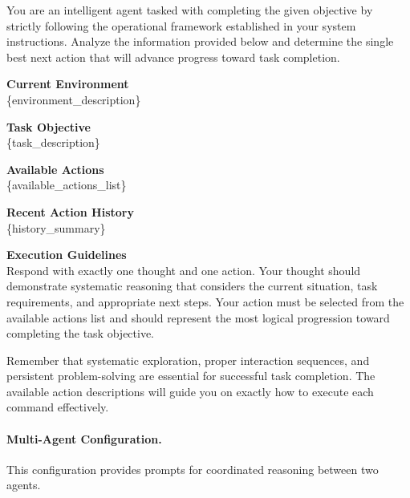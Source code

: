 \begin{tcolorbox}[
    colback=gray!10!white,
    colframe=black,
    title={User prompt for single-agent},
    fonttitle=\bfseries\small,
    breakable,
    enhanced,
    left=2mm,
    right=2mm,
    top=2mm,
    bottom=2mm,
    boxsep=1mm,
    arc=0pt,
    fontupper=\small\ttfamily,  %
    before skip=6pt,
    after skip=6pt
]
\begin{flushleft}
You are an intelligent agent tasked with completing the given objective by strictly following the operational framework established in your system instructions. Analyze the information provided below and determine the single best next action that will advance progress toward task completion.

\textbf{Current Environment}\\
\{environment\_description\}

\textbf{Task Objective}\\
\{task\_description\}

\textbf{Available Actions}\\
\{available\_actions\_list\}

\textbf{Recent Action History}\\
\{history\_summary\}

\textbf{Execution Guidelines}\\
Respond with exactly one thought and one action. Your thought should demonstrate systematic reasoning that considers the current situation, task requirements, and appropriate next steps. Your action must be selected from the available actions list and should represent the most logical progression toward completing the task objective.

Remember that systematic exploration, proper interaction sequences, and persistent problem-solving are essential for successful task completion. The available action descriptions will guide you on exactly how to execute each command effectively.
\end{flushleft}
\end{tcolorbox}

\paragraph{Multi-Agent Configuration.}
This configuration provides prompts for coordinated reasoning between two agents.

